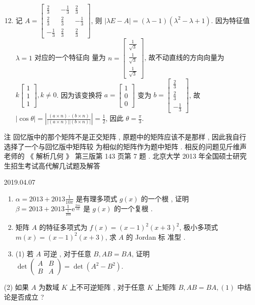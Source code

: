 \documentclass[10pt]{article}
\begin{document}
\begin{enumerate}
  \setcounter{enumi}{11}
  \item  记  $A=\left[\begin{array}{rrr}\frac{2}{3} & -\frac{1}{3} & \frac{2}{3} \\ \frac{2}{3} & \frac{2}{3} & -\frac{1}{3} \\ -\frac{1}{3} & \frac{2}{3} & \frac{2}{3}\end{array}\right]$,  则  $|\lambda E-A|=(\lambda-1)\left(\lambda^{2}-\lambda+1\right)$.  因为特征值  $\lambda=1$  对应的一个特征向   量为  $n=\left[\begin{array}{c}\frac{1}{\sqrt{3}} \\ \frac{1}{\sqrt{3}} \\ \frac{1}{\sqrt{3}}\end{array}\right]$,  故不动直线的方向向量为  $k\left[\begin{array}{l}1 \\ 1 \\ 1\end{array}\right], k \neq 0$.  因为该变换将  $a=\left[\begin{array}{l}1 \\ 0 \\ 0\end{array}\right]$  变为  $b=\left[\begin{array}{r}\frac{2}{3} \\ \frac{2}{3} \\ -\frac{1}{3}\end{array}\right]$,  故  $|\cos \theta|=\left|\frac{(a \times n) \cdot(b \times n)}{|(a \times n)||(b \times n)|}\right|=\frac{1}{2}$,  因此  $\theta=\frac{\pi}{3}$.
\end{enumerate}
 注   回忆版中的那个矩阵不是正交矩阵 ,  原题中的矩阵应该不是那样 ,  因此我自行选择了一个与回忆版中矩阵较   为相似的矩阵作为题中矩阵 .  相反的问题见斤维声老师的 《 解析几何 》 第三版第  143  页第  7  题 .  北京大学  2013  年全国硕士研究生招生考试高代解几试题及解答 

   

2019.04.07

\begin{enumerate}
  \item $\alpha=2013+2013 \frac{1}{10 \pi}$  是有理多项式  $g(x)$  的一个根 ,  证明  $\beta=2013+2013 \frac{1}{\frac{1}{100}} \mathrm{e}^{\frac{2 \pi i}{s 3}}$  是  $g(x)$  的一个复根 .

  \item  矩阵  $A$  的特征多项式为  $f(x)=(x-1)^{2}(x+3)^{2}$,  极小多项式  $m(x)=(x-1)^{2}(x+3)$,  求  $A$  的  Jordan  标   准型 .

  \item (1)  若  $A$  可逆 ,  对于任意  $B, A B=B A$,  证明  $\operatorname{det}\left(\begin{array}{ll}A & B \\ B & A\end{array}\right)=\operatorname{det}\left(A^{2}-B^{2}\right)$.

\end{enumerate}
(2)  如果  $A$  为数域  $K$  上不可逆矩阵 ,  对于任意  $K$  上矩阵  $B, A B=B A,(1)$  中结论是否成立 ?
\end{document}
